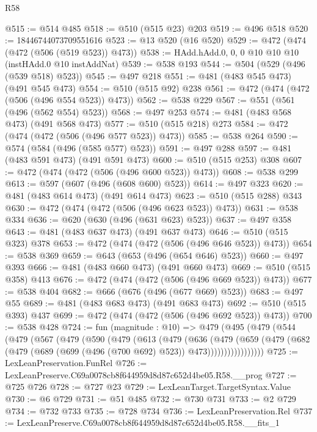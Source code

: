 \begin{lexlean}{R58}
\begin{coremodule}
@515 := @514 @485
@518 := @510 (@515 @23) @203
@519 := @496 @518
@520 := 18446744073709551616
@523 := @13 @520 (@16 @520)
@529 := @472 (@474 (@472 (@506 (@519 @523)) @473))
@538 := HAdd.hAdd.{0, 0, 0} @10 @10 @10 (instHAdd.{0} @10 instAddNat)
@539 := @538 @193
@544 := @504 (@529 (@496 (@539 @518) @523))
@545 := @497 @218
@551 := @481 (@483 @545 @473) (@491 @545 @473)
@554 := @510 (@515 @92) @238
@561 := @472 (@474 (@472 (@506 (@496 @554 @523)) @473))
@562 := @538 @229
@567 := @551 (@561 (@496 (@562 @554) @523))
@568 := @497 @253
@574 := @481 (@483 @568 @473) (@491 @568 @473)
@577 := @510 (@515 @218) @273
@584 := @472 (@474 (@472 (@506 (@496 @577 @523)) @473))
@585 := @538 @264
@590 := @574 (@584 (@496 (@585 @577) @523))
@591 := @497 @288
@597 := @481 (@483 @591 @473) (@491 @591 @473)
@600 := @510 (@515 @253) @308
@607 := @472 (@474 (@472 (@506 (@496 @600 @523)) @473))
@608 := @538 @299
@613 := @597 (@607 (@496 (@608 @600) @523))
@614 := @497 @323
@620 := @481 (@483 @614 @473) (@491 @614 @473)
@623 := @510 (@515 @288) @343
@630 := @472 (@474 (@472 (@506 (@496 @623 @523)) @473))
@631 := @538 @334
@636 := @620 (@630 (@496 (@631 @623) @523))
@637 := @497 @358
@643 := @481 (@483 @637 @473) (@491 @637 @473)
@646 := @510 (@515 @323) @378
@653 := @472 (@474 (@472 (@506 (@496 @646 @523)) @473))
@654 := @538 @369
@659 := @643 (@653 (@496 (@654 @646) @523))
@660 := @497 @393
@666 := @481 (@483 @660 @473) (@491 @660 @473)
@669 := @510 (@515 @358) @413
@676 := @472 (@474 (@472 (@506 (@496 @669 @523)) @473))
@677 := @538 @404
@682 := @666 (@676 (@496 (@677 @669) @523))
@683 := @497 @55
@689 := @481 (@483 @683 @473) (@491 @683 @473)
@692 := @510 (@515 @393) @437
@699 := @472 (@474 (@472 (@506 (@496 @692 @523)) @473))
@700 := @538 @428
@724 := fun (magnitude : @10) =>
  @479
    (@495
      (@479
        (@544
          (@479
            (@567
              (@479
                (@590
                  (@479
                    (@613
                      (@479
                        (@636
                          (@479
                            (@659
                              (@479
                                (@682
                                  (@479 (@689 (@699 (@496 (@700 @692) @523)) @473)))))))))))))))))
@725 := LexLeanPreservation.FunRel
@726 := LexLeanPreserve.C69a0078cb8f644959d8d87c652d4be05.R58.__prog
@727 := @725 @726
@728 := @727 @23
@729 := LexLeanTarget.TargetSyntax.Value
@730 := @6 @729
@731 := @51 @485
@732 := @730 @731
@733 := @2 @729
@734 := @732 @733
@735 := @728 @734
@736 := LexLeanPreservation.Rel
@737 := LexLeanPreserve.C69a0078cb8f644959d8d87c652d4be05.R58.__fits_1

\end{coremodule}
\end{lexlean}
